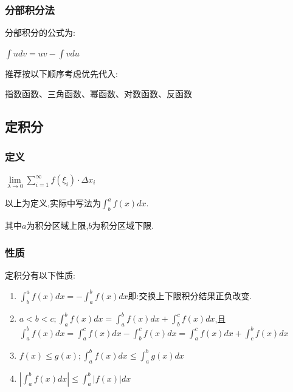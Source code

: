 \documentclass[UTF8,12pt]{ctexbook}
\newcommand{\limNormal}[1]{\lim\limits_{#1}}
\newcommand{\upDownSum}[2]{\sum\limits_{#2}^{#1}}
\newcommand{\defFunction}[1]{f(#1)}
\newcommand{\definiteIntegral}[2]{\int^{#1}_{#2}}
\begin{document}
{{{{  }%

  \subsubsection{分部积分法}{
    分部积分的公式为:

    $\int udv = uv - \int v du$

    推荐按以下顺序考虑优先代入:

    指数函数、三角函数、幂函数、对数函数、反函数
  }%

}%

\subsection{定积分}{

\subsubsection{定义}{
  $\limNormal{\lambda \to 0}\upDownSum{\infty}{i = 1}\defFunction{\xi_i}\cdot\Delta x_i$

  以上为定义,实际中写法为$\definiteIntegral{a}{b}\defFunction{x}dx$.

  其中$a$为积分区域上限,$b$为积分区域下限.
}%

\subsubsection{性质}{
  定积分有以下性质:
  \begin{enumerate}
    \item $\definiteIntegral{a}{b}\defFunction{x}dx = -\definiteIntegral{b}{a}\defFunction{x}dx$即:交换上下限积分结果正负改变.
    \item $a < b < c; \definiteIntegral{b}{a}\defFunction{x}dx = \definiteIntegral{b}{a}\defFunction{x}dx + \definiteIntegral{c}{b}\defFunction{x}dx$,且$\definiteIntegral{b}{a}\defFunction{x}dx = \definiteIntegral{c}{a}\defFunction{x}dx - \definiteIntegral{c}{b}\defFunction{x}dx = \definiteIntegral{c}{a}\defFunction{x}dx + \definiteIntegral{b}{c}\defFunction{x}dx$
    \item $\defFunction{x} \leq g(x); \definiteIntegral{b}{a}\defFunction{x}dx \leq \definiteIntegral{b}{a}g(x)dx$
    \item $|\definiteIntegral{b}{a}\defFunction{x}dx|\leq\definiteIntegral{b}{a}|\defFunction{x}|dx$
  \end{enumerate}
}%

}}}
\end{document}
